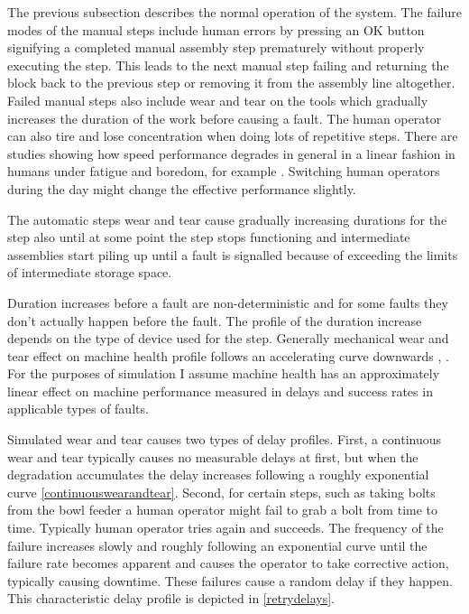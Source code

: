 \documentclass[journal]{IEEEtran}
\begin{document}
The previous subsection describes the normal operation of the system. The failure modes of the manual steps include human errors by pressing an OK button
signifying a completed manual assembly step prematurely without properly executing the step. This leads to the next manual step failing and
returning the block back to the previous step or removing it from the assembly line altogether.
Failed manual steps also include wear and tear
on the tools which gradually increases the duration of the work before causing a fault. The human operator can also tire and lose concentration
when doing lots of repetitive steps. There are studies showing how speed performance degrades in general in a linear fashion in humans
under fatigue and boredom, for example \cite{fatigue}. Switching human operators during the day might change the effective performance slightly.

The automatic steps wear and tear cause gradually increasing durations for the step also until at some point the step stops functioning and
intermediate assemblies start piling up until a fault is signalled because of exceeding the limits of intermediate storage space.

Duration increases before a fault are non-deterministic and for some faults they don't actually happen before the fault. The profile of the duration
increase depends on the type of device used for the step. Generally mechanical wear and tear effect on machine health profile follows
an accelerating curve downwards \cite{eker2012major}, \cite{milldataset}. For the purposes of simulation I assume machine health has an approximately
linear effect on machine performance measured in delays and success rates in applicable types of faults.

Simulated wear and tear causes two types of delay profiles. First,
a continuous wear and tear typically causes no measurable delays at first, but when the degradation accumulates the delay increases following
a roughly exponential curve \ref{continuouswearandtear}. Second, for certain steps, such as taking bolts from the bowl feeder a human operator
might fail to grab a bolt from time to time. Typically human operator tries again and succeeds. The frequency of the failure increases
slowly and roughly following an exponential curve until the failure rate becomes apparent and causes the operator to take corrective action,
typically causing downtime. These failures cause a random delay if they happen. This characteristic delay profile is depicted in \ref{retrydelays}.
\end{document}
